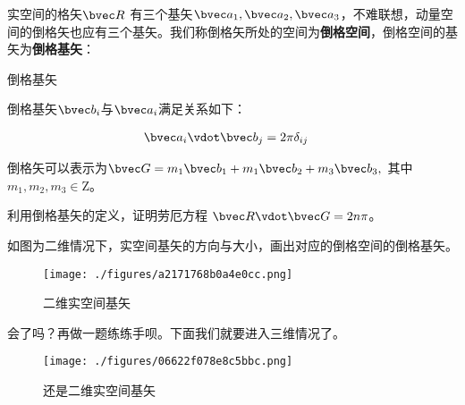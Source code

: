 实空间的格矢$\bvec R$ 有三个基矢$\bvec a_1, \bvec a_2, \bvec a_3$，不难联想，动量空间的倒格矢也应有三个基矢。我们称倒格矢所处的空间为\textbf{倒格空间}，倒格空间的基矢为\textbf{倒格基矢}：
\begin{definition}{倒格基矢}

倒格基矢$\bvec b_i$与$\bvec a_i$满足关系如下：

\begin{align}
\bvec a_i \vdot \bvec b_j  &= 2\pi \delta_{ij}
\end{align}


\end{definition}
倒格矢可以表示为$\bvec G = m_1 \bvec b_1 +  m_1 \bvec b_2 + m_3 \bvec b_3,~$其中$ m_1,m_2,m_3 \in \mathrm{Z}$。
\begin{exercise}{}
利用倒格基矢的定义，证明劳厄方程 $\bvec R \vdot \bvec G = 2 n \pi$。
\end{exercise}
\begin{exercise}{}
如图为二维情况下，实空间基矢的方向与大小，画出对应的倒格空间的倒格基矢。
\begin{figure}[ht]
\centering
\texttt{[image: ./figures/a2171768b0a4e0cc.png]}
\caption{二维实空间基矢} \label{fig_RecLat_5}
\end{figure}

\end{exercise}

\begin{exercise}{}
会了吗？再做一题练练手呗。下面我们就要进入三维情况了。
\begin{figure}[ht]
\centering
\texttt{[image: ./figures/06622f078e8c5bbc.png]}
\caption{还是二维实空间基矢} \label{fig_RecLat_6}
\end{figure}

\end{exercise}